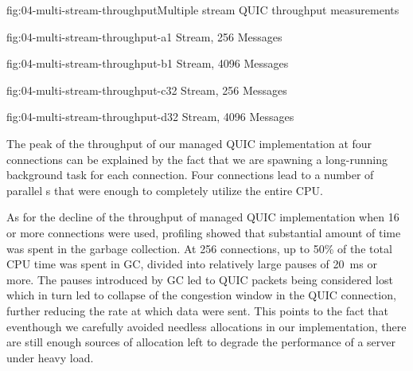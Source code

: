 \begin{myFigure}{fig:04-multi-stream-throughput}{Multiple stream QUIC throughput measurements}
\begin{mySubfigure}{0.49\linewidth}{fig:04-multi-stream-throughput-a}{1 Stream, \SI{256}{\byte} Messages}
\footnotesize

\end{mySubfigure}
\begin{mySubfigure}{0.49\linewidth}{fig:04-multi-stream-throughput-b}{1 Stream, \SI{4096}{\byte} Messages}
\footnotesize

\end{mySubfigure}

\begin{mySubfigure}{0.49\linewidth}{fig:04-multi-stream-throughput-c}{32 Stream, \SI{256}{\byte} Messages}
\footnotesize

\end{mySubfigure}
\begin{mySubfigure}{0.49\linewidth}{fig:04-multi-stream-throughput-d}{32 Stream, \SI{4096}{\byte} Messages}
\footnotesize

\end{mySubfigure}
\end{myFigure}

The peak of the throughput of our managed QUIC implementation at four connections can be explained
by the fact that we are spawning a long-running background task for each connection. Four
connections lead to a number of parallel s that were enough to completely utilize the
entire CPU\@.

As for the decline of the throughput of managed QUIC implementation when 16 or more connections were
used, profiling showed that substantial amount of time was spent in the garbage collection. At 256
connections, up to 50\% of the total CPU time was spent in GC, divided into relatively large pauses
of \SI{20}{\milli\second} or more. The pauses introduced by GC led to QUIC packets being considered
lost which in turn led to collapse of the congestion window in the QUIC connection, further reducing
the rate at which data were sent. This points to the fact that eventhough we carefully avoided
needless allocations in our implementation, there are still enough sources of allocation left to
degrade the performance of a server under heavy load.

